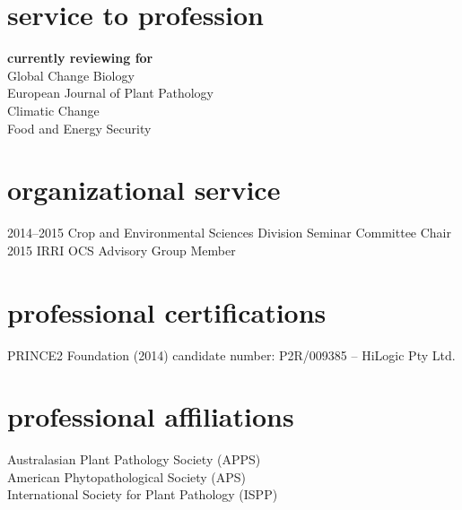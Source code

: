         \section*{service to profession}
        \textbf{currently reviewing for}\\
        Global Change Biology\\
        European Journal of Plant Pathology\\
        Climatic Change\\
        Food and Energy Security\\
        
      \section*{organizational service}
        \begin{entrylist}
          \entry
        	{2014--2015}
        	{Crop and Environmental Sciences Division Seminar Committee Chair}
        	{}
        	{}
	      \entry  
	        {2015}
        	{IRRI OCS Advisory Group Member}
        	{}
        	{}
        \end{entrylist}
        \section*{professional certifications}
        PRINCE2 Foundation (2014) candidate number: P2R/009385 – HiLogic Pty Ltd.
        
        \section*{professional affiliations}
        Australasian Plant Pathology Society (APPS)\\
        American Phytopathological Society (APS)\\
        International Society for Plant Pathology (ISPP)\\

